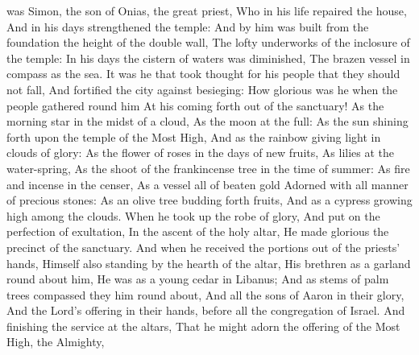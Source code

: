  was Simon, the son of Onias, the great priest, Who in his life repaired the house, And in his days strengthened the temple: And by him was built from the foundation the height of the double wall, The lofty underworks of the inclosure of the temple: In his days the cistern of waters was diminished, The brazen vessel in compass as the sea. It was he that took thought for his people that they should not fall, And fortified the city against besieging: How glorious was he when the people gathered round him At his coming forth out of the sanctuary! As the morning star in the midst of a cloud, As the moon at the full: As the sun shining forth upon the temple of the Most High, And as the rainbow giving light in clouds of glory: As the flower of roses in the days of new fruits, As lilies at the water-spring, As the shoot of the frankincense tree in the time of summer: As fire and incense in the censer, As a vessel all of beaten gold Adorned with all manner of precious stones: As an olive tree budding forth fruits, And as a cypress growing high among the clouds. When he took up the robe of glory, And put on the perfection of exultation, In the ascent of the holy altar, He made glorious the precinct of the sanctuary. And when he received the portions out of the priests' hands, Himself also standing by the hearth of the altar, His brethren as a garland round about him, He was as a young cedar in Libanus; And as stems of palm trees compassed they him round about, And all the sons of Aaron in their glory, And the Lord's offering in their hands, before all the congregation of Israel. And finishing the service at the altars, That he might adorn the offering of the Most High, the Almighty,


